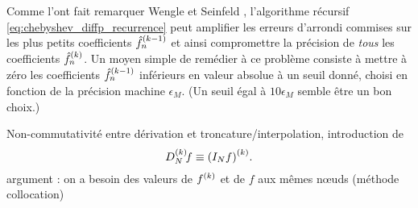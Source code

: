 Comme l'ont fait remarquer Wengle et Seinfeld \cite{wengle1978}, l'algorithme récursif \eqref{eq:chebyshev_diffp_recurrence} peut amplifier les erreurs d'arrondi commises sur les plus petits coefficients ${\hat{f}}^{({k-1})}_{n}$ et ainsi compromettre la précision de \emph{tous} les coefficients ${\hat{f}}^{({k})}_{n}$. %
Un moyen simple de remédier à ce problème consiste à mettre à zéro les coefficients ${\hat{f}}^{({k-1})}_{n}$ inférieurs en valeur absolue à un seuil donné, choisi en fonction de la précision machine $\epsilon_M$.%
(Un seuil égal à $10 \epsilon_M$ semble être un bon choix.)
\par\bigskip
Non-commutativité entre dérivation et troncature/interpolation, introduction de 
\begin{equation}
	\interpderiv{f}{N}{k} \equiv \deriv{ \left( \interpolant{f}{N} \right) }{k}.
	\label{eq:chebyshev_interpderiv}
\end{equation}
argument : on a besoin des valeurs de ${f}^{({k})}$ et de $f$ aux mêmes n\oe uds (méthode collocation)


